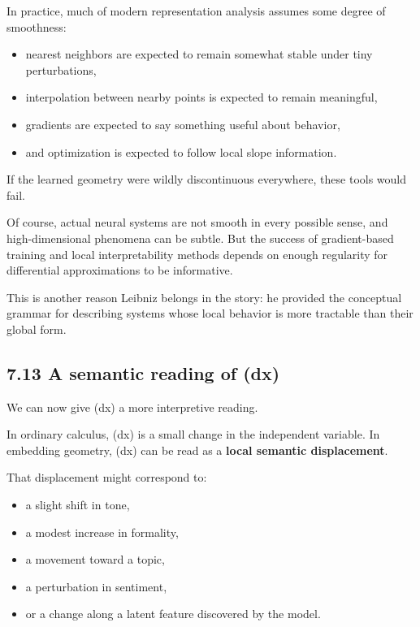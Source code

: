 \documentclass[
]{article}
\providecommand{\tightlist}{%
  \setlength{\itemsep}{0pt}\setlength{\parskip}{0pt}}
\begin{document}
In practice, much of modern representation analysis assumes some degree
of smoothness:

\begin{itemize}
\tightlist
\item
  nearest neighbors are expected to remain somewhat stable under tiny
  perturbations,
\item
  interpolation between nearby points is expected to remain meaningful,
\item
  gradients are expected to say something useful about behavior,
\item
  and optimization is expected to follow local slope information.
\end{itemize}

If the learned geometry were wildly discontinuous everywhere, these
tools would fail.

Of course, actual neural systems are not smooth in every possible sense,
and high-dimensional phenomena can be subtle. But the success of
gradient-based training and local interpretability methods depends on
enough regularity for differential approximations to be informative.

This is another reason Leibniz belongs in the story: he provided the
conceptual grammar for describing systems whose local behavior is more
tractable than their global form.

\hypertarget{a-semantic-reading-of-dx}{%
\subsection{7.13 A semantic reading of
(dx)}\label{a-semantic-reading-of-dx}}

We can now give (dx) a more interpretive reading.

In ordinary calculus, (dx) is a small change in the independent
variable. In embedding geometry, (dx) can be read as a \textbf{local
semantic displacement}.

That displacement might correspond to:

\begin{itemize}
\tightlist
\item
  a slight shift in tone,
\item
  a modest increase in formality,
\item
  a movement toward a topic,
\item
  a perturbation in sentiment,
\item
  or a change along a latent feature discovered by the model.
\end{itemize}
\end{document}
